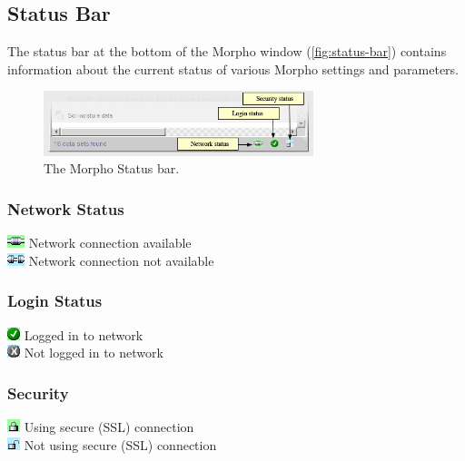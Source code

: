 \subsection{Status Bar} \label{sec:status-bar}

The status bar at the bottom of the Morpho window
(\autoref{fig:status-bar}) contains information about the current status
of various Morpho settings and parameters.

\begin{figure}
  \centering
    \includegraphics[width=0.7\textwidth]{images/status-bar.jpg}
  \caption{The Morpho Status bar.}
  \label{fig:status-bar}
\end{figure}

\subsubsection*{Network Status}
\includegraphics[scale=0.9]{images/indicator-online.png} \hspace{1em}
  Network connection available\\
\includegraphics[scale=0.9]{images/indicator-offline.png} \hspace{1em}
  Network connection not available

\subsubsection*{Login Status}
\includegraphics[scale=0.9]{images/indicator-logged-in.png} \hspace{1em}
  Logged in to network\\
\includegraphics[scale=0.9]{images/indicator-not-logged-in.png} \hspace{1em}
  Not logged in to network

\subsubsection*{Security}
\includegraphics[scale=0.9]{images/indicator-ssl.png} \hspace{1em}
  Using secure (SSL) connection\\
\includegraphics[scale=0.9]{images/indicator-nossl.png} \hspace{1em}
  Not using secure (SSL) connection

